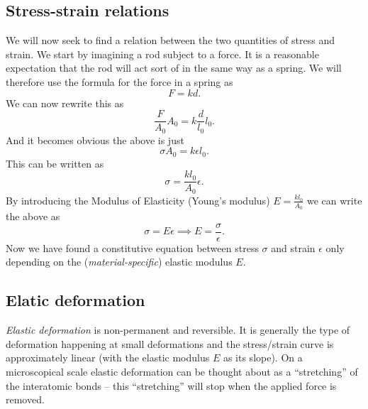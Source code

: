 \subsection{Stress-strain relations}
We will now seek to find a relation between the two quantities of stress and strain. We start by imagining a rod subject to a force. It is a reasonable expectation that the rod will act sort of in the same way as a spring. We will therefore use the formula for the force in a spring as
\[ 
F = kd
.\]
We can now rewrite this as
\[ 
\frac{F}{A_0} A_0 = k \frac{d}{l_0} l_0
.\]
And it becomes obvious the above is just
\[ 
\sigma A_0 = k \epsilon l_0
.\]
This can be written as
\[ 
\sigma = \frac{k l_0}{A_0} \epsilon
.\]
By introducing the Modulus of Elasticity (Young's modulus) $E = \frac{k l_0}{A_0}$ we can write the above as
\[ 
\sigma = E \epsilon \implies E = \frac{\sigma}{\epsilon}
.\]
Now we have found a constitutive equation between stress $\sigma$ and strain $\epsilon$ only depending on the (\textit{material-specific}) elastic modulus $E$.

\subsection{Elatic deformation}
\textit{Elastic deformation} is non-permanent and reversible. It is generally the type of deformation happening at small deformations and the stress/strain curve is approximately linear (with the elastic modulus $E$ as its slope). On a microscopical scale elastic deformation can be thought about as a ``stretching'' of the interatomic bonds -- this ``stretching'' will stop when the applied force is removed.

